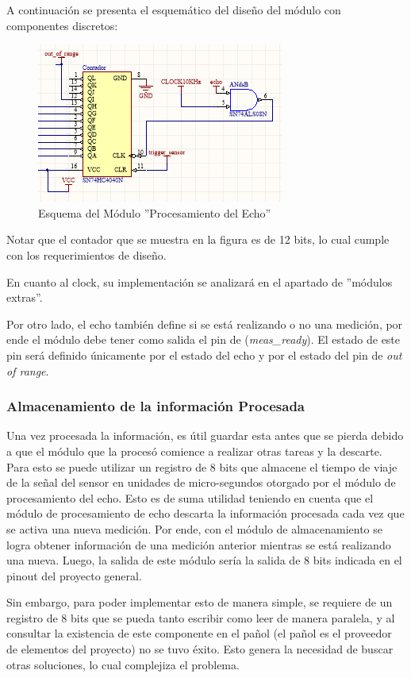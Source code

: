 A continuación se presenta el esquemático del diseño del módulo con
componentes discretos:

\begin{figure}[H]
\centering
\includegraphics[scale=0.7]{esquemaProcesamientoDeEcho.PNG}
\caption{Esquema del Módulo ''Procesamiento del Echo''}
\end{figure}

Notar que el contador que se muestra en la figura es de 12 bits, lo
cual cumple con los requerimientos de diseño.

En cuanto al clock, su implementación se analizará en el apartado
de ''módulos extras''.

Por otro lado, el echo también define si se está realizando o no una
medición, por ende el módulo debe tener como salida el pin de (\textit{meas\_ready}).
El estado de este pin será definido únicamente por el estado del echo
y por el estado del pin de \textit{out of range}.

\subsubsection{Almacenamiento de la información Procesada}

Una vez procesada la información, es útil guardar esta antes que se
pierda debido a que el módulo que la procesó comience a realizar otras
tareas y la descarte. Para esto se puede utilizar un registro de 8
bits que almacene el tiempo de viaje de la señal del sensor en unidades
de micro-segundos otorgado por el módulo de procesamiento del echo.
Esto es de suma utilidad teniendo en cuenta que el módulo de procesamiento
de echo descarta la información procesada cada vez que se activa una
nueva medición. Por ende, con el módulo de almacenamiento 
se logra obtener información de una medición anterior mientras se
está realizando una nueva. Luego, la salida de este módulo
sería la salida de 8 bits indicada en el pinout del proyecto general.

Sin embargo, para poder implementar esto de manera simple, se requiere
de un registro de 8 bits que se pueda tanto escribir como leer de
manera paralela, y al consultar la existencia de este componente en
el pañol (el pañol es el proveedor de elementos del proyecto) no se
tuvo éxito. Esto genera la necesidad de buscar otras soluciones, lo
cual complejiza el problema. 

